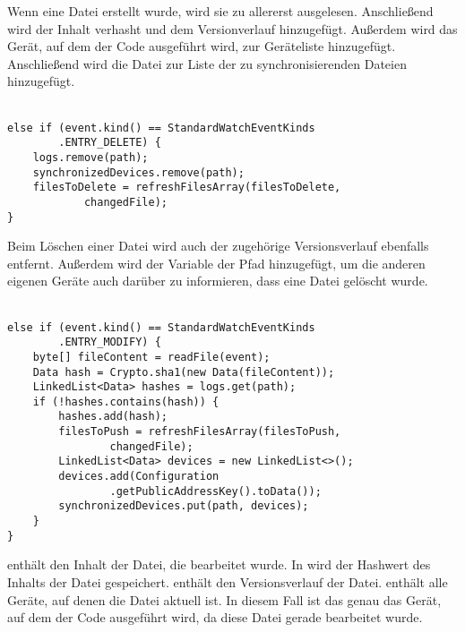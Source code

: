 Wenn eine Datei erstellt wurde, wird sie zu allererst ausgelesen. Anschließend wird der Inhalt verhasht und dem Versionverlauf hinzugefügt. Außerdem wird das Gerät, auf dem der Code ausgeführt wird, zur Geräteliste  hinzugefügt. Anschließend wird die Datei zur Liste der zu synchronisierenden Dateien hinzugefügt.\\ \\
\javalisting
\begin{minipage}{\linewidth}
\begin{lstlisting}[caption={Löschen einer Datei},captionpos=b]
else if (event.kind() == StandardWatchEventKinds
		.ENTRY_DELETE) {
	logs.remove(path);
	synchronizedDevices.remove(path);
	filesToDelete = refreshFilesArray(filesToDelete,
			changedFile);
}
\end{lstlisting}
\end{minipage}
Beim Löschen einer Datei wird auch der zugehörige Versionsverlauf ebenfalls entfernt. Außerdem wird der Variable  der Pfad hinzugefügt, um die anderen eigenen Geräte auch darüber zu informieren, dass eine Datei gelöscht wurde. \\ \\
\javalisting
\begin{minipage}{\linewidth}
\begin{lstlisting}[caption={Bearbeiten einer Datei},captionpos=b]
else if (event.kind() == StandardWatchEventKinds
		.ENTRY_MODIFY) {
	byte[] fileContent = readFile(event);
	Data hash = Crypto.sha1(new Data(fileContent));
	LinkedList<Data> hashes = logs.get(path);
	if (!hashes.contains(hash)) {
		hashes.add(hash);
		filesToPush = refreshFilesArray(filesToPush,
				changedFile);
		LinkedList<Data> devices = new LinkedList<>();
		devices.add(Configuration
				.getPublicAddressKey().toData());
		synchronizedDevices.put(path, devices);
	}
}
\end{lstlisting}
\end{minipage}
\begin{description}
	 enthält den Inhalt der Datei, die bearbeitet wurde.
	In  wird der Hashwert des Inhalts der Datei gespeichert.
	 enthält den Versionsverlauf der Datei. 
	 enthält alle Geräte, auf denen die Datei aktuell ist. In diesem Fall ist das genau das Gerät, auf dem der Code ausgeführt wird, da diese Datei gerade bearbeitet wurde.
\end{description}
